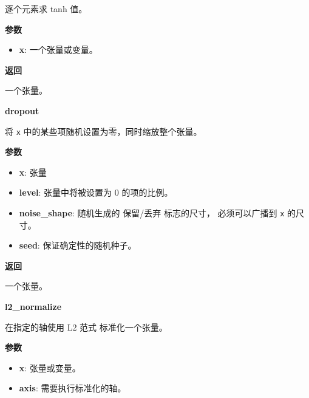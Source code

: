 逐个元素求 tanh 值。

\textbf{参数}

\begin{itemize}
\tightlist
\item
  \textbf{x}: 一个张量或变量。
\end{itemize}

\textbf{返回}

一个张量。


\textbf{dropout}\label{dropout}

\begin{Shaded}
\begin{Highlighting}[]
\OperatorTok{=}\OperatorTok{=}\NormalTok{)}
\end{Highlighting}
\end{Shaded}

将 \texttt{x} 中的某些项随机设置为零，同时缩放整个张量。

\textbf{参数}

\begin{itemize}
\tightlist
\item
  \textbf{x}: 张量
\item
  \textbf{level}: 张量中将被设置为 0 的项的比例。
\item
  \textbf{noise\_shape}: 随机生成的 保留/丢弃 标志的尺寸，
  必须可以广播到 \texttt{x} 的尺寸。
\item
  \textbf{seed}: 保证确定性的随机种子。
\end{itemize}

\textbf{返回}

一个张量。


\textbf{l2\_normalize}\label{l2ux5fnormalize}

\begin{Shaded}
\begin{Highlighting}[]
\OperatorTok{=}\NormalTok{)}
\end{Highlighting}
\end{Shaded}

在指定的轴使用 L2 范式 标准化一个张量。

\textbf{参数}

\begin{itemize}
\tightlist
\item
  \textbf{x}: 张量或变量。
\item
  \textbf{axis}: 需要执行标准化的轴。
\end{itemize}

